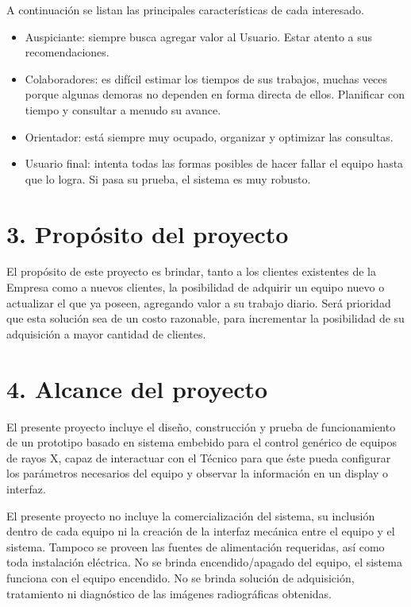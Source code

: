 \documentclass[
11pt, %
]{charter}
\begin{document}

A continuación se listan las principales características de cada interesado.
 
\begin{itemize}
	\item Auspiciante: siempre busca agregar valor al Usuario. Estar atento a sus recomendaciones.
	\item Colaboradores: es difícil estimar los tiempos de sus trabajos, muchas veces porque algunas demoras no dependen en forma directa de ellos. Planificar con tiempo y consultar a menudo su avance.
	\item Orientador: está siempre muy ocupado, organizar y optimizar las consultas.
	\item Usuario final: intenta todas las formas posibles de hacer fallar el equipo hasta que lo logra. Si pasa su prueba, el sistema es muy robusto.
\end{itemize}


\newpage
\section{3. Propósito del proyecto}
\label{sec:proposito}

El propósito de este proyecto es brindar, tanto a los clientes existentes de la Empresa como a nuevos clientes, la posibilidad de adquirir un equipo nuevo o actualizar el que ya poseen, agregando valor a su trabajo diario. Será prioridad que esta solución sea de un costo razonable, para incrementar la posibilidad de su adquisición a mayor cantidad de clientes. 

\section{4. Alcance del proyecto}
\label{sec:alcance}

El presente proyecto incluye el diseño, construcción y prueba de funcionamiento de un prototipo basado en sistema embebido para el control genérico de equipos de rayos X, capaz de interactuar con el Técnico para que éste pueda configurar los parámetros necesarios del equipo y observar la información en un display o interfaz. 

El presente proyecto no incluye la comercialización del sistema, su inclusión dentro de cada equipo ni la creación de la interfaz mecánica entre el equipo y el sistema. Tampoco se proveen las fuentes de alimentación requeridas, así como toda instalación eléctrica. No se brinda encendido/apagado del equipo, el sistema funciona con el equipo encendido. No se brinda solución de adquisición, tratamiento ni diagnóstico de las imágenes radiográficas obtenidas.
\end{document}
